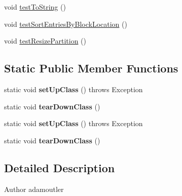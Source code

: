 \begin{DoxyCompactItemize}
\item 
void \hyperlink{class_c_a_s_u_a_l_1_1archiving_1_1libpit_1_1_pit_data_test_a9d025b886ad792244c4f18cd35d58567}{test\-To\-String} ()
\item 
void \hyperlink{class_c_a_s_u_a_l_1_1archiving_1_1libpit_1_1_pit_data_test_aad5bc53ad568e48db94a0b36d01b1f14}{test\-Sort\-Entries\-By\-Block\-Location} ()
\item 
void \hyperlink{class_c_a_s_u_a_l_1_1archiving_1_1libpit_1_1_pit_data_test_ac5145bb5dc38c8c102afc66da9ecc5a7}{test\-Resize\-Partition} ()
\end{DoxyCompactItemize}
\subsection*{Static Public Member Functions}
\begin{DoxyCompactItemize}
\item 
\hypertarget{class_c_a_s_u_a_l_1_1archiving_1_1libpit_1_1_pit_data_test_ae6d0c9b6d0d8d4552a617d27cf19f03f}{static void {\bfseries set\-Up\-Class} ()  throws Exception }\label{class_c_a_s_u_a_l_1_1archiving_1_1libpit_1_1_pit_data_test_ae6d0c9b6d0d8d4552a617d27cf19f03f}

\item 
\hypertarget{class_c_a_s_u_a_l_1_1archiving_1_1libpit_1_1_pit_data_test_afc8660df7ded0c765b2f1e52a97e8dae}{static void {\bfseries tear\-Down\-Class} ()}\label{class_c_a_s_u_a_l_1_1archiving_1_1libpit_1_1_pit_data_test_afc8660df7ded0c765b2f1e52a97e8dae}

\item 
\hypertarget{class_c_a_s_u_a_l_1_1archiving_1_1libpit_1_1_pit_data_test_ae6d0c9b6d0d8d4552a617d27cf19f03f}{static void {\bfseries set\-Up\-Class} ()  throws Exception }\label{class_c_a_s_u_a_l_1_1archiving_1_1libpit_1_1_pit_data_test_ae6d0c9b6d0d8d4552a617d27cf19f03f}

\item 
\hypertarget{class_c_a_s_u_a_l_1_1archiving_1_1libpit_1_1_pit_data_test_afc8660df7ded0c765b2f1e52a97e8dae}{static void {\bfseries tear\-Down\-Class} ()}\label{class_c_a_s_u_a_l_1_1archiving_1_1libpit_1_1_pit_data_test_afc8660df7ded0c765b2f1e52a97e8dae}

\end{DoxyCompactItemize}


\subsection{Detailed Description}
\begin{DoxyAuthor}{Author}
adamoutler 
\end{DoxyAuthor}


